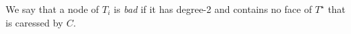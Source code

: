 \documentclass{patmorin}
\newcommand{\dual}[1]{{#1}^\star}
\begin{document}
%
%
%
%
%
%

We say that a node of $T_i$ is \emph{bad} if it has degree-2 and contains
no face of $\dual{T}$ that is caressed by $C$.
\end{document}

